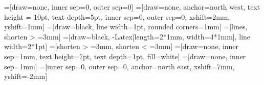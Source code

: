 \usetikzlibrary{shapes.geometric, arrows.meta, calc, decorations.pathmorphing}

\newcommand{\unit}{1mm}
\newcommand{\arrow}{{Latex[length=2*\unit, width=4*\unit]}}
\newcommand{\lineWidth}{1pt}

\newcommand{\figFullWidth}{16cm}
\newcommand{\figHalfWidth}{8cm}
\newcommand{\vSep}{2mm}

=[draw=none, inner sep=0, outer sep=0]
=[draw=none, anchor=north west, text height = 10pt, text depth=5pt, inner sep=0, outer sep=0, xshift=2mm, yshift=1mm]
=[draw=black, line width=\lineWidth, rounded corners=1mm]
=[lines, shorten > =3mm]
=[draw=black, -\arrow, line width=2*\lineWidth]
=[shorten > =3mm, shorten < =3mm]
=[draw=none, inner sep=1mm, text height=7pt, text depth=1pt, fill=white]
=[draw=none, inner sep=1mm]
=[inner sep=0, outer sep=0, anchor=north east, xshift=7mm, yshift=-2mm]